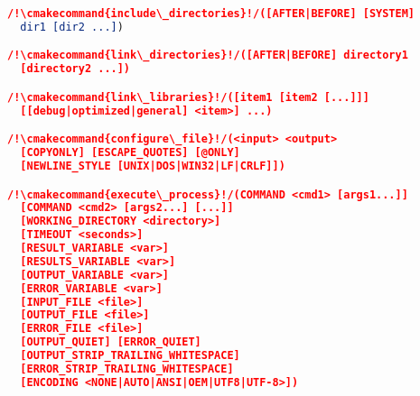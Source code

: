 \documentclass{article}
\newcommand{\cmakecommand}[1]{{\href{https://cmake.org/cmake/help/v3.13/command/#1.html}{#1}}}
\begin{document}
\begin{minipage}[t]{0.18\linewidth}
\begin{lstlisting}[language=CMake]
/!\cmakecommand{include\_directories}!/([AFTER|BEFORE] [SYSTEM]
  dir1 [dir2 ...])

/!\cmakecommand{link\_directories}!/([AFTER|BEFORE] directory1
  [directory2 ...])

/!\cmakecommand{link\_libraries}!/([item1 [item2 [...]]]
  [[debug|optimized|general] <item>] ...)

/!\cmakecommand{configure\_file}!/(<input> <output>
  [COPYONLY] [ESCAPE_QUOTES] [@ONLY]
  [NEWLINE_STYLE [UNIX|DOS|WIN32|LF|CRLF]])

/!\cmakecommand{execute\_process}!/(COMMAND <cmd1> [args1...]]
  [COMMAND <cmd2> [args2...] [...]]
  [WORKING_DIRECTORY <directory>]
  [TIMEOUT <seconds>]
  [RESULT_VARIABLE <var>]
  [RESULTS_VARIABLE <var>]
  [OUTPUT_VARIABLE <var>]
  [ERROR_VARIABLE <var>]
  [INPUT_FILE <file>]
  [OUTPUT_FILE <file>]
  [ERROR_FILE <file>]
  [OUTPUT_QUIET] [ERROR_QUIET]
  [OUTPUT_STRIP_TRAILING_WHITESPACE]
  [ERROR_STRIP_TRAILING_WHITESPACE]
  [ENCODING <NONE|AUTO|ANSI|OEM|UTF8|UTF-8>])
\end{lstlisting}
\end{minipage}
\hfill\vline\hfill
\end{document}
